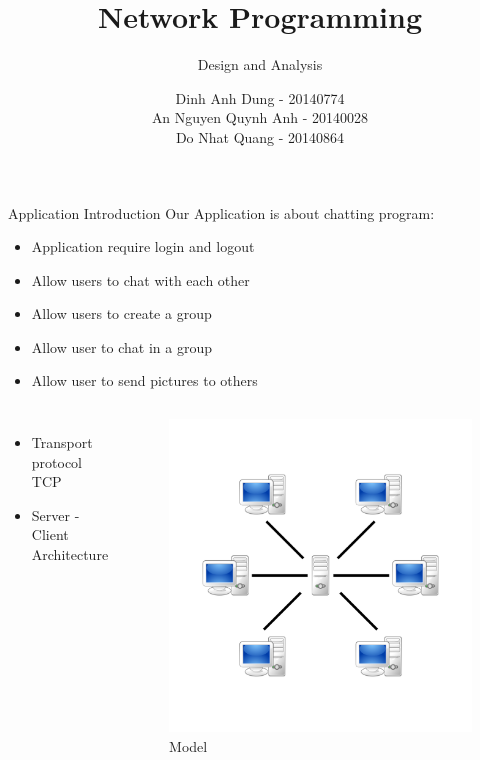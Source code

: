 \documentclass{beamer}
\title[Short Title]{Network Programming}
\subtitle{Design and Analysis}
\author{Dinh Anh Dung - 20140774 \\ An Nguyen Quynh Anh - 20140028 \\ Do Nhat Quang - 20140864}
\institute{\large \textbf{Hanoi University of Science and Technology}}
\date{}
\begin{document}
\begin{frame}
\titlepage
\end{frame}

\begin{frame}{Application Introduction}
Our Application is about chatting program:

\begin{itemize}
\item Application require login and logout
\item Allow users to chat with each other
\item Allow users to create a group
\item Allow user to chat in a group
\item Allow user to send pictures to others
\end{itemize}
\end{frame}


\begin{frame}
\begin{columns}
\begin{itemize}
\item Transport protocol TCP
\item Server - Client Architecture
\end{itemize}
\begin{figure}
\includegraphics[scale=0.15]{1200px-Server-based-network.svg.png}
\caption{Model}
\end{figure}
\end{columns}
\end{frame}
\end{document}
